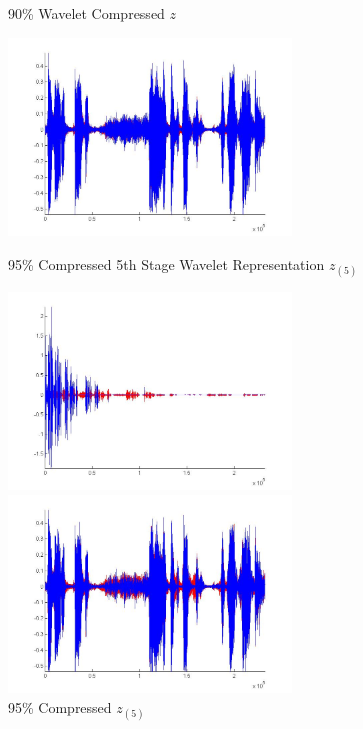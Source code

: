 \documentclass{report}
\begin{document}
\begin{figure}
\center
\caption{90\% Wavelet Compressed $z$}
\label{fig:stage4p9}
\includegraphics[height=5.25cm]{reConstructp9}


\caption{95\% Compressed 5th Stage Wavelet Representation $z_{(5)}$}
\label{fig:stage4p95}
\includegraphics[height=5.25cm]{stage4p95}

\caption{95\% Compressed $z_{(5)}$}
\label{fig:stage4p95}
\includegraphics[height=5.25cm]{reConstructp95}

\end{figure}
\end{document}

